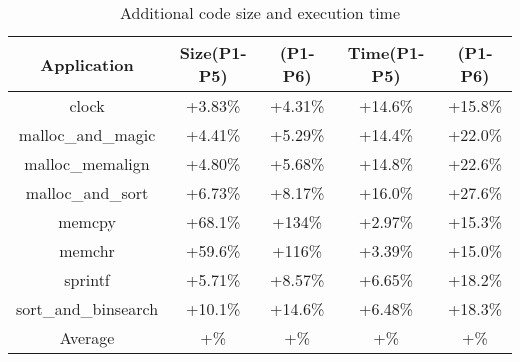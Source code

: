 \begin{table}[htbp]
\footnotesize
\caption{Additional code size and execution time}\label{tb-simple-perf}
\vspace{-5pt}
\begin{center}
\begin{tabular}{|c|cc|cc|}
\hline
\textbf{Application} & \textbf{Size(P1-P5)} & \textbf{(P1-P6)} & \textbf{Time(P1-P5)} & \textbf{(P1-P6)}\\
\hline
clock & +3.83\% & +4.31\% & +14.6\% & +15.8\% \\
\hline
malloc\_and\_magic & +4.41\% & +5.29\% & +14.4\%  & +22.0\% \\
\hline
malloc\_memalign & +4.80\% & +5.68\% & +14.8\% & +22.6\% \\
\hline
malloc\_and\_sort & +6.73\% & +8.17\% & +16.0\% & +27.6\% \\
\hline
memcpy & +68.1\% & +134\% & +2.97\% & +15.3\% \\
\hline
memchr & +59.6\% & +116\% & +3.39\% & +15.0\% \\
\hline
sprintf & +5.71\% & +8.57\% & +6.65\% & +18.2\% \\
\hline
sort\_and\_binsearch & +10.1\% & +14.6\% & +6.48\% & +18.3\%\\
\hline
Average & +\% & +\% & +\% & +\%\\
\hline 
\end{tabular}
\end{center}
\vspace{-8pt}
\end{table}

